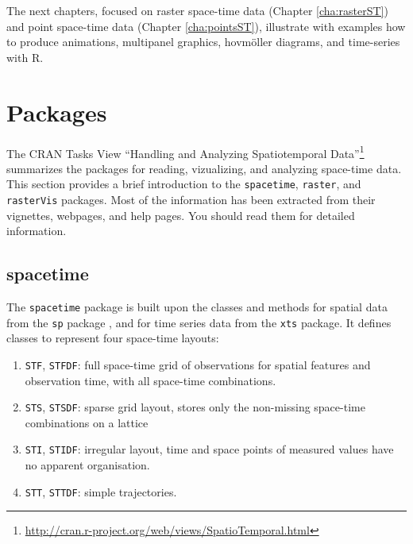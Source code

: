The next chapters, focused on raster space-time data (Chapter
\ref{cha:rasterST}) and point space-time data (Chapter
\ref{cha:pointsST}), illustrate with examples how to produce
animations, multipanel graphics, hovmöller diagrams, and
time-series with \textsf{R}.

\section{Packages}
\label{sec:spacetime-packages}

The CRAN Tasks View ``Handling and Analyzing Spatiotemporal
Data''\footnote{\url{http://cran.r-project.org/web/views/SpatioTemporal.html}}
summarizes the packages for reading, vizualizing, and analyzing
space-time data. This section provides a brief introduction to the
\texttt{spacetime}, \texttt{raster}, and \texttt{rasterVis}
packages. Most of the information has been extracted from their
vignettes, webpages, and help pages. You should read them for detailed
information.

\subsection{spacetime}
\label{sec:spacetime}
 The \texttt{spacetime}
package \cite{Pebesma2012} is built upon the classes and methods for
spatial data from the \texttt{sp} package , and for time series data
from the \texttt{xts} package. It defines classes to represent four
space-time layouts:
\begin{enumerate}
\item \texttt{STF}, \texttt{STFDF}: full space-time grid of
  observations for spatial features and observation time, with all
  space-time combinations.
\item \texttt{STS}, \texttt{STSDF}: sparse grid layout, stores only
  the non-missing space-time combinations on a lattice
\item \texttt{STI}, \texttt{STIDF}: irregular layout, time and space
  points of measured values have no apparent organisation.
\item \texttt{STT}, \texttt{STTDF}: simple trajectories.
\end{enumerate}

